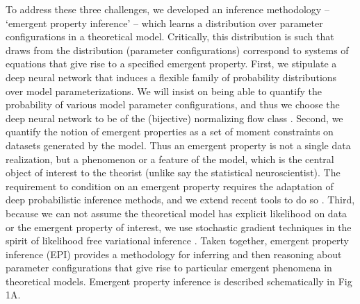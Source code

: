 \documentclass[11pt]{article}
\begin{document}
To address these three challenges, we developed an inference methodology -- `emergent property inference' -- which learns a distribution over parameter configurations in a theoretical model.  Critically, this distribution is such that draws from the distribution (parameter configurations) correspond to systems of equations that give rise to a specified emergent property.  
First, we stipulate a deep neural network that induces a flexible family of probability distributions over model parameterizations.   We will insist on being able to quantify the probability of various model parameter configurations, and thus we choose the deep neural network to be of the (bijective) normalizing flow class \cite{rezende2015variational}.
Second, we quantify the notion of emergent properties as a set of moment constraints on datasets generated by the model.  
Thus an emergent property is not a single data realization, but a phenomenon or a feature of the model, which is the central object of interest to the theorist (unlike say the statistical neuroscientist).  
The requirement to condition on an emergent property requires the adaptation of deep probabilistic inference methods, and we extend recent tools to do so \cite{loaiza2017maximum}.
Third,  because we can not assume the theoretical model has explicit likelihood on data or the emergent property of interest, we use stochastic gradient techniques in the spirit of likelihood free variational inference \cite{tran2017hierarchical}.    
Taken together, emergent property inference (EPI) provides a methodology for inferring and then reasoning about parameter configurations that give rise to particular emergent phenomena in theoretical models.   
Emergent property inference is described schematically in Fig 1A.
\end{document}
